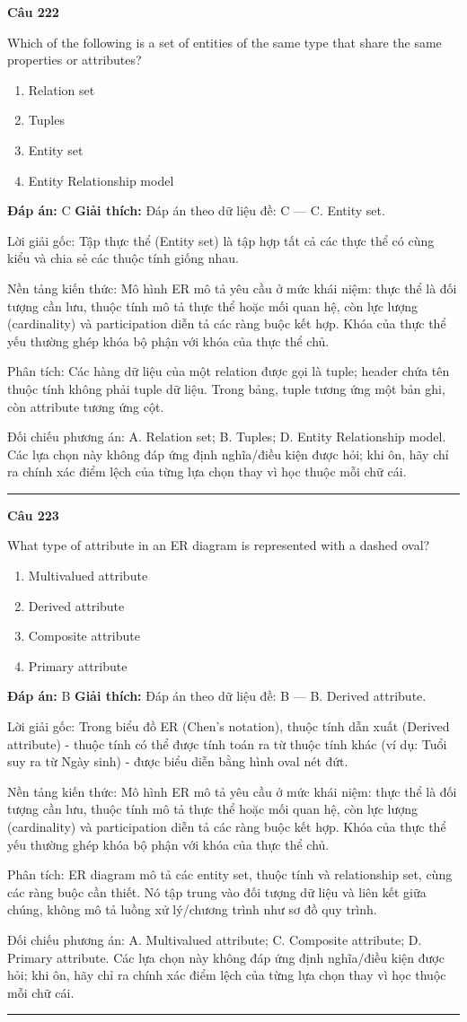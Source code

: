 \documentclass[11pt,a4paper]{article}
\newenvironment{question}[1]{%
  \par\vspace{1em}\noindent\textbf{\large Câu #1}\par\vspace{0.4em}
}{%
  \par\vspace{1em}\hrule\vspace{0.6em}
}
\newenvironment{choices}{%
  \begin{enumerate}[label=\textbf{\Alph*.},leftmargin=2.2em,itemsep=2pt,topsep=3pt]
}{%
  \end{enumerate}
}
\newcommand{\choice}{\item}
\begin{document}
\begin{question}{222}
Which of the following is a set of entities of the same type that share the same properties or attributes?
\begin{choices}
\choice Relation set
\choice Tuples
\choice Entity set
\choice Entity Relationship model
\end{choices}
\textbf{Đáp án:} C
\textbf{Giải thích:} Đáp án theo dữ liệu đề: C — C. Entity set.

Lời giải gốc: Tập thực thể (Entity set) là tập hợp tất cả các thực thể có cùng kiểu và chia sẻ các thuộc tính giống nhau.

Nền tảng kiến thức: Mô hình ER mô tả yêu cầu ở mức khái niệm: thực thể là đối tượng cần lưu, thuộc tính mô tả thực thể hoặc mối quan hệ, còn lực lượng (cardinality) và participation diễn tả các ràng buộc kết hợp. Khóa của thực thể yếu thường ghép khóa bộ phận với khóa của thực thể chủ.

Phân tích: Các hàng dữ liệu của một relation được gọi là tuple; header chứa tên thuộc tính không phải tuple dữ liệu. Trong bảng, tuple tương ứng một bản ghi, còn attribute tương ứng cột.

Đối chiếu phương án: A. Relation set; B. Tuples; D. Entity Relationship model. Các lựa chọn này không đáp ứng định nghĩa/điều kiện được hỏi; khi ôn, hãy chỉ ra chính xác điểm lệch của từng lựa chọn thay vì học thuộc mỗi chữ cái.
\end{question}

\begin{question}{223}
What type of attribute in an ER diagram is represented with a dashed oval?
\begin{choices}
\choice Multivalued attribute
\choice Derived attribute
\choice Composite attribute
\choice Primary attribute
\end{choices}
\textbf{Đáp án:} B
\textbf{Giải thích:} Đáp án theo dữ liệu đề: B — B. Derived attribute.

Lời giải gốc: Trong biểu đồ ER (Chen's notation), thuộc tính dẫn xuất (Derived attribute) - thuộc tính có thể được tính toán ra từ thuộc tính khác (ví dụ: Tuổi suy ra từ Ngày sinh) - được biểu diễn bằng hình oval nét đứt.

Nền tảng kiến thức: Mô hình ER mô tả yêu cầu ở mức khái niệm: thực thể là đối tượng cần lưu, thuộc tính mô tả thực thể hoặc mối quan hệ, còn lực lượng (cardinality) và participation diễn tả các ràng buộc kết hợp. Khóa của thực thể yếu thường ghép khóa bộ phận với khóa của thực thể chủ.

Phân tích: ER diagram mô tả các entity set, thuộc tính và relationship set, cùng các ràng buộc cần thiết. Nó tập trung vào đối tượng dữ liệu và liên kết giữa chúng, không mô tả luồng xử lý/chương trình như sơ đồ quy trình.

Đối chiếu phương án: A. Multivalued attribute; C. Composite attribute; D. Primary attribute. Các lựa chọn này không đáp ứng định nghĩa/điều kiện được hỏi; khi ôn, hãy chỉ ra chính xác điểm lệch của từng lựa chọn thay vì học thuộc mỗi chữ cái.
\end{question}
\end{document}
